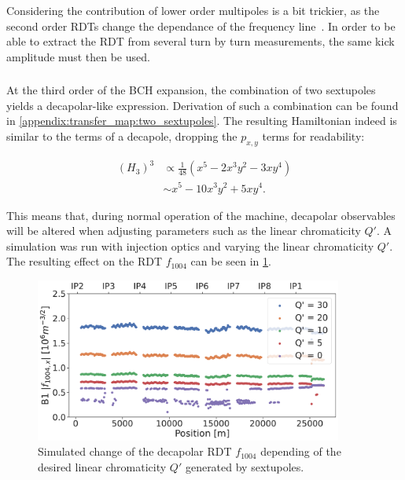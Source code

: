 Considering the contribution of lower order multipoles is a bit trickier, as the second order RDTs
change the dependance of the frequency line~\cite{franchi_first_2014}. In order to be able to
extract the RDT from several turn by turn measurements, the same kick amplitude must then be used.


\subsubsection{}

At the third order of the BCH expansion, the combination of two sextupoles yields a decapolar-like
expression. Derivation of such a combination can be found in
\cref{appendix:transfer_map:two_sextupoles}. The resulting Hamiltonian indeed is similar to
the terms of a decapole, dropping the $p_{x,y}$ terms for readability:

\begin{equation}
    \begin{aligned}
         (H_3)^3 &\propto \frac{1}{48} \left(x^5 - 2x^3y^2 - 3xy^4 \right)\\
                 &\sim    x^5 - 10x^3y^2 + 5xy^4.
    \end{aligned}
\end{equation}

This means that, during normal operation of the machine, decapolar observables will be altered when
adjusting parameters such as the linear chromaticity $Q'$. A simulation was run with injection
optics and varying the linear chromaticity $Q'$. The resulting effect on the RDT $f_{1004}$ can be
seen in \cref{decapoles:rdts:simulated_f1004_from_sextupoles}.

\begin{figure}[H]
    \centering
    \includegraphics[width=0.9\textwidth]{./images/f1004/f1004_dq.pdf}
    \caption{Simulated change of the decapolar RDT $f_{1004}$ depending of the desired linear
    chromaticity $Q'$ generated by sextupoles.}
    \label{decapoles:rdts:simulated_f1004_from_sextupoles}
\end{figure}



